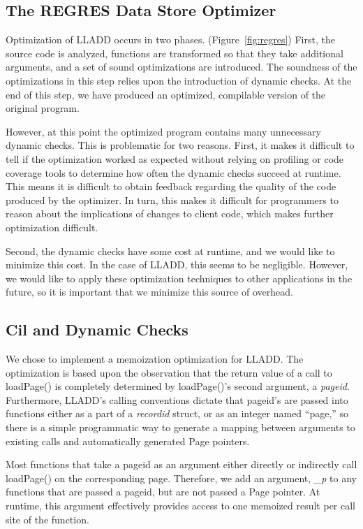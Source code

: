 \documentclass[10pt,letterpaper,twocolumn,english]{article}
\newcommand{\yad}{LLADD\xspace}
\newcommand{\pin}{loadPage()\xspace}
\newcommand{\PP}{\_p\xspace}
\begin{document}
\subsection{The REGRES Data Store Optimizer}

Optimization of \yad occurs in two phases. (Figure~\ref{fig:regres})  First, the source code is
analyzed, functions are transformed so that they take additional
arguments, and a set of sound optimizations are introduced.  The
soundness of the optimizations in this step relies upon the
introduction of dynamic checks.  At the end of this step, we have produced an
optimized, compilable version of the original program.

However, at this point the optimized program contains many unnecessary dynamic checks.
  This is problematic for two
reasons.  First, it makes it difficult to tell if the optimization
worked as expected without relying on profiling or code coverage tools
to determine how often the dynamic checks succeed at runtime.  This
means it is difficult to obtain feedback regarding the
quality of the code produced by the optimizer.  In turn, this makes it
difficult for programmers to reason about the implications of changes
to client code, which makes further optimization difficult.  

Second,
the dynamic checks have some cost at runtime, and we would like to
minimize this cost.  In the case of \yad, this seems to be negligible.
However, we would like to apply these optimization techniques to other
applications in the future, so it is important that we minimize this
source of overhead.

\subsection{Cil and Dynamic Checks}

We chose to implement a memoization optimization for \yad.  The
optimization is based upon the observation that the return value of a
call to \pin is completely determined by \pin's second argument, a {\em
pageid}.  Furthermore, \yad's calling conventions dictate that
pageid's are passed into functions either as a part of a {\em
recordid} struct, or as an integer named ``page,'' so there is a
simple programmatic way to generate a mapping between arguments to
existing calls and automatically generated Page pointers.

Most functions that take a pageid as an argument either directly or
indirectly call \pin on the corresponding page.  Therefore, we add an
argument, {\em\PP} to any functions that are passed a pageid, but are
not passed a Page pointer.  At runtime, this argument effectively
provides access to one memoized result per call site of the
function.
\end{document}
